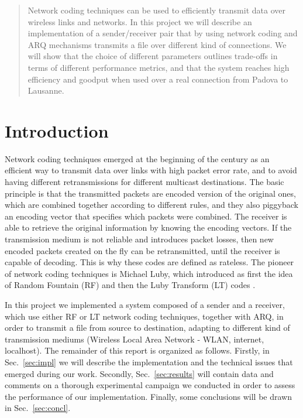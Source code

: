\begin{abstract}
Network coding techniques can be used to efficiently transmit data over wireless links and networks. In this project we will describe an implementation of a sender/receiver pair that by using network coding and ARQ mechanisms transmits a file over different kind of connections. We will show that the choice of different parameters outlines trade-offs in terms of different performance metrics, and that the system reaches high efficiency and goodput when used over a real connection from Padova to Lausanne.
\end{abstract}

\section{Introduction}
Network coding techniques emerged at the beginning of the century as an efficient way to transmit data over links with high packet error rate, and to avoid having different retransmissions for different multicast destinations. The basic principle is that the transmitted packets are encoded version of the original ones, which are combined together according to different rules, and they also piggyback an encoding vector that specifies which packets were combined. The receiver is able to retrieve the original information by knowing the encoding vectors. If the transmission medium is not reliable and introduces packet losses, then new encoded packets created on the fly can be retransmitted, until the receiver is capable of decoding. This is why these codes are defined as rateless. The pioneer of network coding techniques is Michael Luby, which introduced as first the idea of Random Fountain (RF) \cite{rf} and then the Luby Transform (LT) codes \cite{lt}.

In this project we implemented a system composed of a sender and a receiver, which use either RF or LT network coding techniques, together with ARQ, in order to transmit a file from source to destination, adapting to different kind of transmission mediums (Wireless Local Area Network - WLAN, internet, localhost). The remainder of this report is organized as follows. Firstly, in Sec.~\ref{sec:impl} we will describe the implementation and the technical issues that emerged during our work. Secondly, Sec.~\ref{sec:results} will contain data and comments on a thorough experimental campaign we conducted in order to assess the performance of our implementation. Finally, some conclusions will be drawn in Sec.~\ref{sec:concl}.
